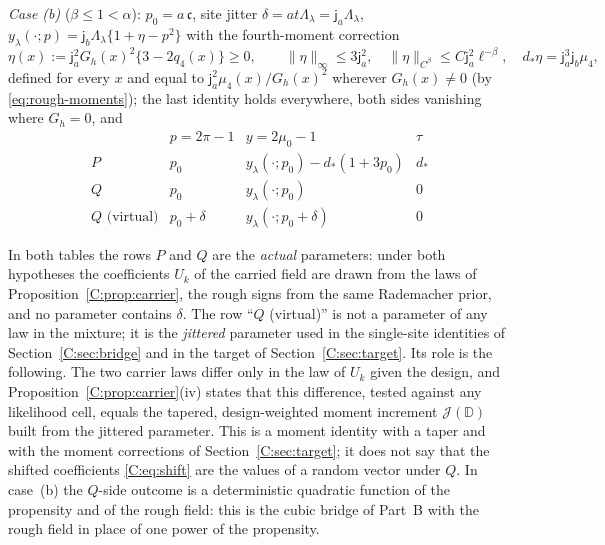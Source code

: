 \documentclass[11pt]{article}
\newcommand{\cJ}{\mathcal{J}}
\newcommand{\norm}[1]{\lVert #1\rVert}
\newcommand{\ja}{\mathsf{j}_a}
\newcommand{\jb}{\mathsf{j}_b}
\newcommand{\cf}{\mathfrak{c}}
\begin{document}
\emph{Case (b)} (\(\beta\le1<\alpha\)): \(p_0=a\,\cf\), site jitter
\(\delta=at\Lambda_\lambda=\ja\Lambda_\lambda\),
\(y_\lambda(\cdot;p)=\jb\Lambda_\lambda\{1+\eta-p^2\}\) with the
fourth-moment correction
\begin{equation}
 \eta(x):=\ja^2G_h(x)^2\{3-2q_4(x)\}\ge0,
 \qquad
 \norm\eta_\infty\le3\ja^2,\quad \norm\eta_{C^\beta}\le C\ja^2\ell^{-\beta},\quad
 d_*\eta=\ja^3\jb\mu_4 ,
 \label{C:eq:eta}
\end{equation}
defined for every \(x\) and equal to \(\ja^2\mu_4(x)/G_h(x)^2\) wherever
\(G_h(x)\ne0\) (by \eqref{eq:rough-moments}); the last identity holds
everywhere, both sides vanishing where \(G_h=0\),
and
\begin{equation}
\begin{array}{c|ccc}
 &p=2\pi-1&y=2\mu_0-1&\tau\\ \hline
 P&p_0&y_\lambda(\cdot;p_0)-d_*(1+3p_0)&d_*\\
 Q&p_0&y_\lambda(\cdot;p_0)&0\\ \hline
 Q\text{ (virtual)}&p_0+\delta&y_\lambda(\cdot;p_0+\delta)&0
\end{array}
\label{C:eq:two-sides-b}
\end{equation}

In both tables the rows \(P\) and \(Q\) are the \emph{actual}
parameters: under both hypotheses the coefficients \(U_k\) of the carried
field are drawn from the laws of Proposition~\ref{C:prop:carrier}, the
rough signs from the same Rademacher prior, and no parameter contains
\(\delta\).  The row ``\(Q\) (virtual)'' is not a parameter of any law in
the mixture; it is the \emph{jittered} parameter used in the single-site
identities of Section~\ref{C:sec:bridge} and in the target of
Section~\ref{C:sec:target}.  Its role is the following.  The two carrier
laws differ only in the law of \(U_k\) given the design, and
Proposition~\ref{C:prop:carrier}(iv) states that this difference, tested
against any likelihood cell, equals the tapered, design-weighted moment
increment \(\cJ(\mathbb D)\) built from the jittered parameter.  This is a
moment identity with a taper and with the moment corrections of
Section~\ref{C:sec:target}; it does not say that the shifted coefficients
\eqref{C:eq:shift} are the values of a random vector under \(Q\).  In case~(b)
the \(Q\)-side outcome is a deterministic quadratic function of the
propensity and of the rough field: this is the cubic bridge of Part~B with the
rough field in place of one power of the propensity.
\end{document}
